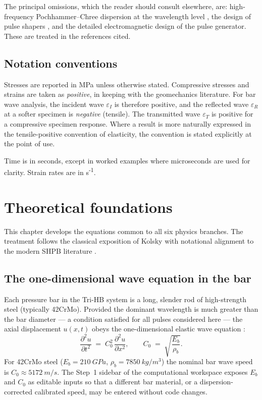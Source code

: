 \documentclass[11pt,a4paper,openany]{book}
\providecommand{\SI}[2]{\qty{#1}{#2}}
\theoremstyle{handbook}
\newcommand{\eps}{\varepsilon}
\newcommand{\Cz}{C_0}
\begin{document}
The principal omissions, which the reader should consult elsewhere, are:
high-frequency Pochhammer--Chree dispersion at the wavelength level
\cite{Davies1948,GrahamPC}, the design of pulse shapers
\cite{FrewForrestal2002}, and the detailed electromagnetic design of the
pulse generator. These are treated in the references cited.

\section{Notation conventions}

Stresses are reported in MPa unless otherwise stated. Compressive stresses
and strains are taken as \emph{positive}, in keeping with the geomechanics
literature. For bar wave analysis, the incident wave $\eps_I$ is therefore
positive, and the reflected wave $\eps_R$ at a softer specimen is
\emph{negative} (tensile). The transmitted wave $\eps_T$ is positive for a
compressive specimen response. Where a result is more naturally expressed in
the tensile-positive convention of elasticity, the convention is stated
explicitly at the point of use.

Time is in seconds, except in worked examples where microseconds are used for
clarity. Strain rates are in s\textsuperscript{-1}.

\chapter{Theoretical foundations}\label{ch:foundations}

This chapter develops the equations common to all six physics branches. The
treatment follows the classical exposition of Kolsky \cite{Kolsky1949,Kolsky1963}
with notational alignment to the modern SHPB literature
\cite{ChenSong2011,GrayHandbook}.

\section{The one-dimensional wave equation in the bar}\label{sec:wave-eq}

Each pressure bar in the Tri-HB system is a long, slender rod of high-strength
steel (typically 42CrMo). Provided the dominant wavelength is much greater
than the bar diameter --- a condition satisfied for all pulses considered here
--- the axial displacement $u(x,t)$ obeys the one-dimensional elastic wave
equation \cite{Graff1975}:
\begin{equation}
  \frac{\partial^{2}u}{\partial t^{2}} \;=\; \Cz^{2}\,\frac{\partial^{2}u}{\partial x^{2}},
  \qquad
  \Cz \;=\; \sqrt{\frac{E_b}{\rho_b}} .
  \label{eq:wave-eq}
\end{equation}
For 42CrMo steel ($E_b = \SI{210}{GPa}$, $\rho_b = \SI{7850}{kg/m^{3}}$) the
nominal bar wave speed is $\Cz \approx \SI{5172}{m/s}$. The Step~1 sidebar of
the computational workspace exposes $E_b$ and $\Cz$ as editable inputs so that a
different bar material, or a dispersion-corrected calibrated speed, may be
entered without code changes.
\end{document}
